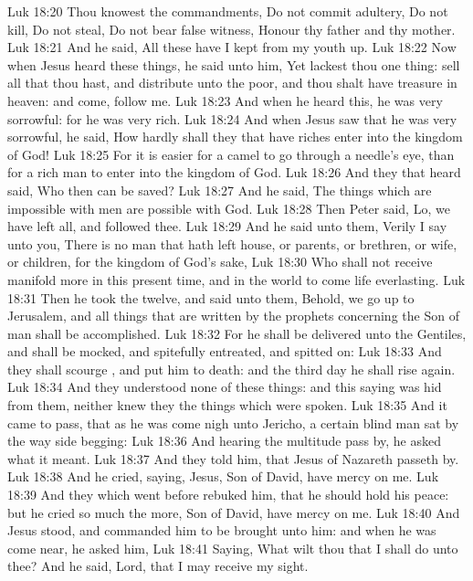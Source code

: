 \vs Luk 18:20 Thou knowest the commandments, Do not commit adultery, Do not kill, Do not steal, Do not bear false witness, Honour thy father and thy mother.
\vs Luk 18:21 And he said, All these have I kept from my youth up.
\vs Luk 18:22 Now when Jesus heard these things, he said unto him, Yet lackest thou one thing: sell all that thou hast, and distribute unto the poor, and thou shalt have treasure in heaven: and come, follow me.
\vs Luk 18:23 And when he heard this, he was very sorrowful: for he was very rich.
\vs Luk 18:24 And when Jesus saw that he was very sorrowful, he said, How hardly shall they that have riches enter into the kingdom of God!
\vs Luk 18:25 For it is easier for a camel to go through a needle's eye, than for a rich man to enter into the kingdom of God.
\vs Luk 18:26 And they that heard  said, Who then can be saved?
\vs Luk 18:27 And he said, The things which are impossible with men are possible with God.
\vs Luk 18:28 Then Peter said, Lo, we have left all, and followed thee.
\vs Luk 18:29 And he said unto them, Verily I say unto you, There is no man that hath left house, or parents, or brethren, or wife, or children, for the kingdom of God's sake,
\vs Luk 18:30 Who shall not receive manifold more in this present time, and in the world to come life everlasting.
\vs Luk 18:31 Then he took  the twelve, and said unto them, Behold, we go up to Jerusalem, and all things that are written by the prophets concerning the Son of man shall be accomplished.
\vs Luk 18:32 For he shall be delivered unto the Gentiles, and shall be mocked, and spitefully entreated, and spitted on:
\vs Luk 18:33 And they shall scourge , and put him to death: and the third day he shall rise again.
\vs Luk 18:34 And they understood none of these things: and this saying was hid from them, neither knew they the things which were spoken.
\vs Luk 18:35 And it came to pass, that as he was come nigh unto Jericho, a certain blind man sat by the way side begging:
\vs Luk 18:36 And hearing the multitude pass by, he asked what it meant.
\vs Luk 18:37 And they told him, that Jesus of Nazareth passeth by.
\vs Luk 18:38 And he cried, saying, Jesus,  Son of David, have mercy on me.
\vs Luk 18:39 And they which went before rebuked him, that he should hold his peace: but he cried so much the more,  Son of David, have mercy on me.
\vs Luk 18:40 And Jesus stood, and commanded him to be brought unto him: and when he was come near, he asked him,
\vs Luk 18:41 Saying, What wilt thou that I shall do unto thee? And he said, Lord, that I may receive my sight.
